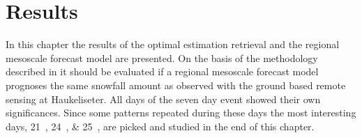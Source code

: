 \chapter{Results} \label{ch:Res}
%
In this chapter the results of the optimal estimation retrieval and the regional mesoscale forecast model are presented. On the basis of the methodology described in  it should be evaluated if a regional mesoscale forecast model prognoses the same snowfall amount as observed with the ground based remote sensing at Haukeliseter. All days of the seven day event showed their own significances. Since some patterns repeated during these days the most interesting days, \SIlist{21;24;25}{\dec}, are picked and studied in the end of this chapter.
%
